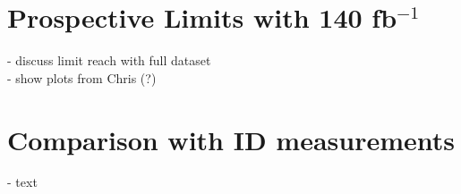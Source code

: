 \section{Prospective Limits with 140 fb$^{-1}$}

- discuss limit reach with full dataset\\
- show plots from Chris (?)\\

\section{Comparison with ID measurements}

- text